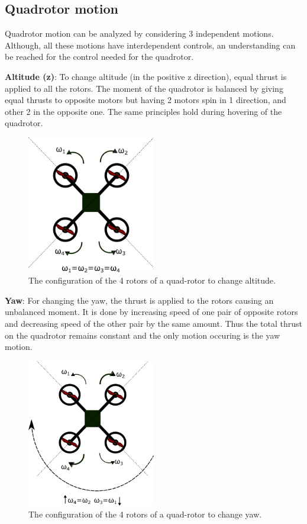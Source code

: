 \documentclass[hidelinks,BTech]{iitmdiss}
\begin{document}
\subsection*{Quadrotor motion}
Quadrotor motion can be analyzed by considering 3 independent motions. Although, all these motions have interdependent controls, an understanding can be reached for the control needed for the quadrotor.

{\bf Altitude (z)}: To change altitude (in the positive z direction), equal thrust is applied to all the rotors. The moment of the quadrotor is balanced by giving equal thrusts to opposite motors but having 2 motors spin in 1 direction, and other 2 in the opposite one. The same principles hold during hovering of the quadrotor.
\begin{figure}[H]
  \centering
    \includegraphics[width=0.5\textwidth]{Quadrotor_altitude.png}
    \caption{The configuration of the 4 rotors of a quad-rotor to change altitude.}
\end{figure}

{\bf Yaw}: For changing the yaw, the thrust is applied to the rotors causing an unbalanced moment. It is done by increasing speed of one pair of opposite rotors and decreasing speed of the other pair by the same amount. Thus the total thrust on the quadrotor remains constant and the only motion occuring is the yaw motion.
\begin{figure}[H]
  \centering
    \includegraphics[width=0.5\textwidth]{Quadrotor_yaw.png}
    \caption{The configuration of the 4 rotors of a quad-rotor to change yaw.}
\end{figure}
\end{document}
